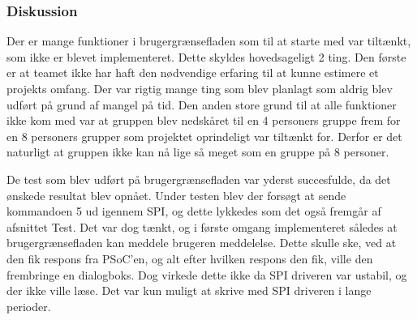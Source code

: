 \subsubsection{Diskussion}

Der er mange funktioner i brugergrænsefladen som til at starte med var tiltænkt, som ikke er blevet implementeret. Dette skyldes hovedsageligt 2 ting. Den første er at teamet ikke har haft den nødvendige erfaring til at kunne estimere et projekts omfang. Der var rigtig mange ting som blev planlagt som aldrig blev udført på grund af mangel på tid. Den anden store grund til at alle funktioner ikke kom med var at gruppen blev nedskåret til en 4 personers gruppe frem for en 8 personers grupper som projektet oprindeligt var tiltænkt for. Derfor er det naturligt at gruppen ikke kan nå lige så meget som en gruppe på 8 personer.

De test som blev udført på brugergrænsefladen var yderst succesfulde, da det ønskede resultat blev opnået. Under testen blev der forsøgt at sende kommandoen 5 ud igennem SPI, og dette lykkedes som det også fremgår af afsnittet Test.  Det var dog tænkt, og i første omgang implementeret således at brugergrænsefladen kan meddele brugeren meddelelse. Dette skulle ske, ved at den fik respons fra PSoC’en, og alt efter hvilken respons den fik, ville den frembringe en dialogboks. Dog virkede dette ikke da SPI driveren var ustabil, og der ikke ville læse. Det var kun muligt at skrive med SPI driveren i lange perioder.
